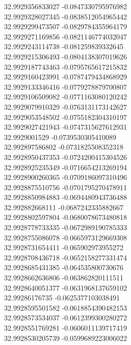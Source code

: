 {32.9929356833027	-0.0847330795976982\\
32.9929328027345	-0.0838512054965442\\
32.9929299473507	-0.0829784355964179\\
32.9929271169856	-0.0821146774032047\\
32.9929243114738	-0.081259839332645\\
32.9929215306493	-0.0804138307019626\\
32.9929187743463	-0.0795765617215832\\
32.9929160423991	-0.0787479434868929\\
32.9929133346416	-0.0779278879700807\\
32.9929106509082	-0.0771163080120242\\
32.9929079910329	-0.0763131173142627\\
32.9929053548502	-0.0755182304310197\\
32.9929027421943	-0.0747315627612931\\
32.9929001529	-0.0739530305410089\\
32.992897586802	-0.0731825508352318\\
32.9928950437353	-0.0724200415304526\\
32.9928925235349	-0.0716654213269194\\
32.9928900260365	-0.0709186097310496\\
32.9928875510756	-0.0701795270478911\\
32.9928850984883	-0.0694480943736488\\
32.992882668111	-0.0687242335882667\\
32.9928802597804	-0.0680078673480818\\
32.9928778733335	-0.0672989190785333\\
32.9928755086078	-0.0665973129669308\\
32.9928731654411	-0.065902973955272\\
32.9928708436718	-0.0652158277331474\\
32.9928685431385	-0.064535800730676\\
32.9928662636806	-0.063862820111511\\
32.9928640051377	-0.0631968137659102\\
32.99286176735	-0.0625377103038491\\
32.9928595501582	-0.0618854390482153\\
32.9928573534037	-0.0612399300280272\\
32.9928551769281	-0.0606011139717419\\
32.9928530205739	-0.0599689223006022\\
}
